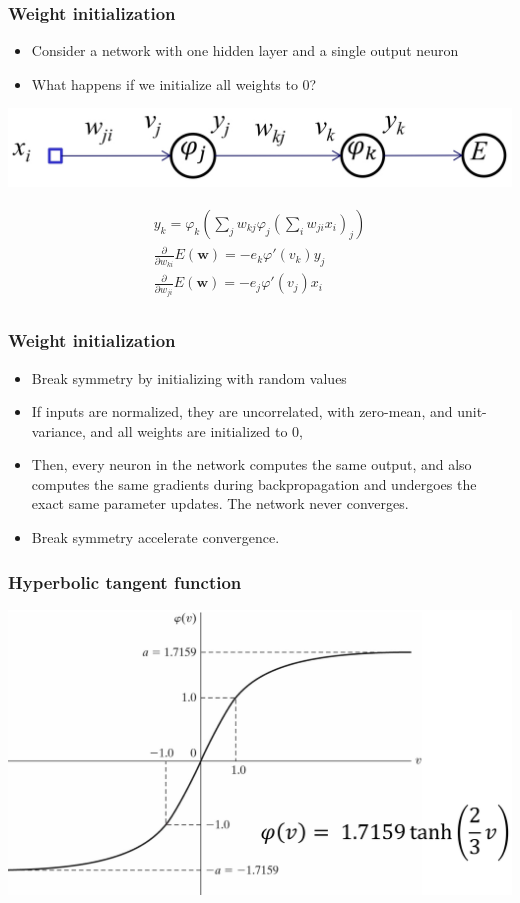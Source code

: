\documentclass[12pt,notes,mathserif]{beamer}
\begin{document}
\begin{frame}[c]
	\frametitle{Weight initialization}
	\begin{itemize}
		\item Consider a network with one hidden layer and a single output neuron
		\item What happens if we initialize all weights to 0?
	\end{itemize}
	\begin{center}
		\includegraphics[width=0.47\linewidth]{fig/lec66.jpg}
	\end{center}
	\[
		\begin{array}{c}
			y_k=\varphi_k\left(\sum\nolimits_jw_{kj}\varphi_j\left(\sum\nolimits_iw_{ji}x_i\right)_j\right) \\
			\frac{\partial}{\partial w_{ki}}E(\mathbf{w})=-e_k\varphi'(v_k)y_j                            \\
			\frac{\partial}{\partial w_{ji}}E(\mathbf{w})=-e_j\varphi'(v_j)x_i                            \\
		\end{array}
	\]
\end{frame}
\begin{frame}[c]
	\frametitle{Weight initialization}
	\begin{itemize}
		\item Break symmetry by initializing with random values
		\item If inputs are normalized, they are uncorrelated, with zero-mean, and unit-variance, and all weights are initialized to 0, 
		\item Then, every neuron in the network computes the same output, and also computes the same gradients during backpropagation and undergoes the exact same parameter updates. The network never converges. 
		\item Break symmetry accelerate convergence.
	\end{itemize}
\end{frame}

\begin{frame}[c]
	\frametitle{Hyperbolic tangent function}
	\begin{center}
		\includegraphics[width=0.95\linewidth]{fig/lec68.jpg}
	\end{center}
\end{frame}
\end{document}
